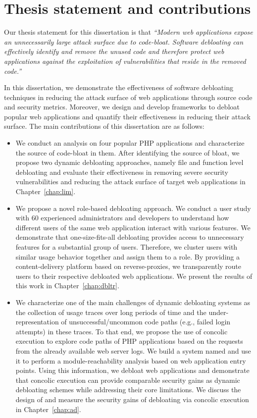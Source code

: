 \section{Thesis statement and contributions}

Our thesis statement for this dissertation is that \textit{``Modern web applications expose an unnecessarily large attack surface due to code-bloat. Software debloating can effectively identify and remove the unused code and therefore protect web applications against the exploitation of vulnerabilities that reside in the removed code.''}

In this dissertation, we demonstrate the effectiveness of software debloating techniques in reducing the attack surface of web applications through source code and security metrics. 
Moreover, we design and develop frameworks to debloat popular web applications and quantify their effectiveness in reducing their attack surface. The main contributions of this dissertation are as follows:

\begin{itemize}
    \item We conduct an analysis on four popular PHP applications and characterize the source of code-bloat in them. After identifying the source of bloat, we propose two dynamic debloating approaches, namely file and function level debloating and evaluate their effectiveness in removing severe security vulnerabilities and reducing the attack surface of target web applications in Chapter~\ref{chap:lim}.
    \item We propose a novel role-based debloating approach. We conduct a user study with 60 experienced administrators and developers to understand how different users of the same web application interact with various features. We demonstrate that one-size-fits-all debloating provides access to unnecessary features for a substantial group of users. Therefore, we cluster users with similar usage behavior together and assign them to a role. By providing a content-delivery platform based on reverse-proxies, we transparently route users to their respective debloated web applications. We present the results of this work in Chapter~\ref{chap:dbltr}. 
    \item We characterize one of the main challenges of dynamic debloating systems as the collection of usage traces over long periods of time and the under-representation of unsuccessful/uncommon code paths (e.g., failed login attempts) in these traces. To that end, we propose the use of concolic execution to explore code paths of PHP applications based on the requests from the already available web server logs. We build a system named \animatedead{} and use it to perform a module-reachability analysis based on web application entry points. Using this information, we debloat web applications and demonstrate that concolic execution can provide comparable security gains as dynamic debloating schemes while addressing their core limitations. We discuss the design of \animatedead{} and measure the security gains of debloating via concolic execution in Chapter~\ref{chap:ad}.
\end{itemize}